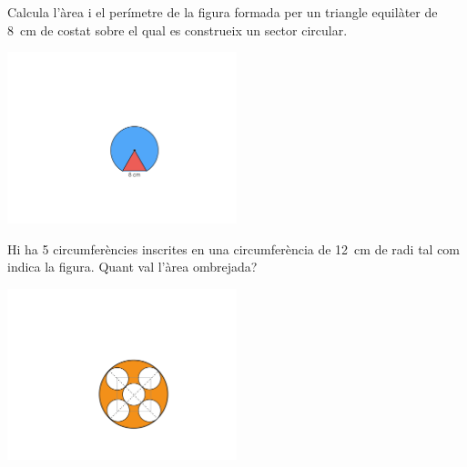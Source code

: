 \begin{mylist}
  
 \vspace*{-1.5cm}
 \exer \begin{minipage}[t]{0.7\textwidth}
 	Calcula l'àrea i el perímetre de la figura formada per un triangle equilàter de 8~cm de costat sobre el qual es construeix un sector circular. 
 \end{minipage}
 \begin{minipage}{0.3\textwidth}
 	\centering
 	\vspace{1.5cm}
 	\includegraphics[width=0.5\textwidth]{img-09/fig11}
 \end{minipage}
 
 
\vspace*{-1.5cm}
\exer \begin{minipage}[t]{0.7\textwidth}
	 Hi ha 5 circumferències inscrites en una circumferència de 12~cm de radi tal com indica la figura. Quant val l'àrea ombrejada?
\end{minipage}
\begin{minipage}{0.3\textwidth}
	\centering
	\vspace{1.5cm}
	\includegraphics[width=0.5\textwidth]{img-09/fig12}
\end{minipage}
 
 

\end{mylist}

